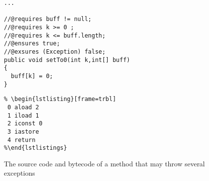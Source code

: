 \begin{figure}
\begin{frameit}
\begin{minipage}[b]{0.5\linewidth}
\begin{verbatim}
...

//@requires buff != null;
//@requires k >= 0 ;
//@requires k <= buff.length;
//@ensures true;
//@exsures (Exception) false;
public void setTo0(int k,int[] buff)
{
  buff[k] = 0;
}
\end{verbatim}
\end{minipage}
\hspace{.5cm}
\begin{minipage}[b]{0.4\linewidth}
\begin{verbatim}
% \begin{lstlisting}[frame=trbl] 
 0 aload 2
 1 iload 1
 2 iconst 0
 3 iastore
 4 return
%\end{lstlistings}
\end{verbatim}
\end{minipage}
\caption{The source code and bytecode of a method that may throw several exceptions}
\label{fig:jmlpreciseex}
\end{frameit}
\end{figure}
